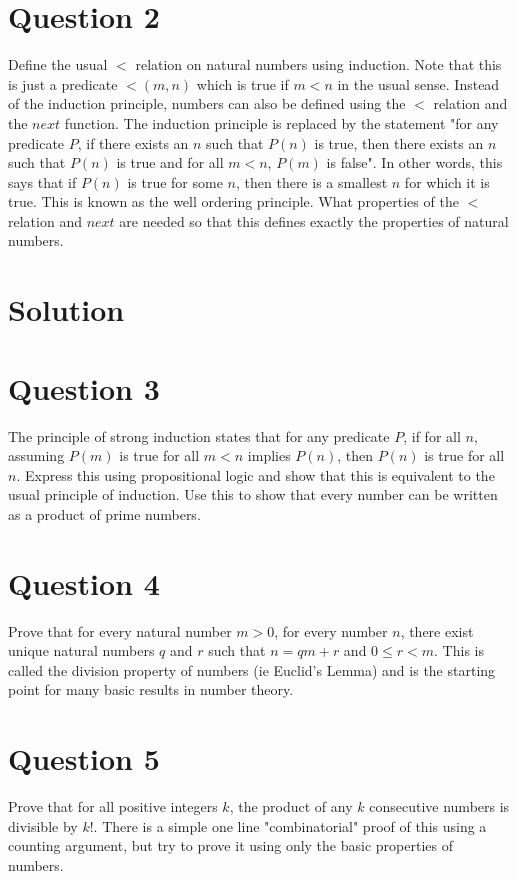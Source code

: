 \documentclass[12pt]{report}
\begin{document}
\section*{Question 2}
Define the usual $<$ relation on natural numbers using induction. Note that this is just a predicate $<(m, n)$ which is true if $m < n$ in the usual sense. Instead of the induction principle, numbers can also be defined using the $<$ relation and the $next$ function. The induction principle is replaced by the statement "for any predicate $P$, if there exists an $n$ such that $P(n)$ is true, then there exists an $n$ such that $P(n)$ is true and for all $m < n$, $P(m)$ is false". In other words, this says that if $P(n)$ is true for some $n$, then there is a smallest $n$ for which it is true. This is known as the well ordering principle. What properties of the $<$ relation and $next$ are needed so that this defines exactly the properties of natural numbers.
\section*{Solution}

\section*{Question 3}
The principle of strong induction states that for any predicate $P$, if for all $n$, assuming $P(m)$ is true for all $m < n$ implies $P(n)$, then $P(n)$ is true for all $n$. Express this using propositional logic and show that this is equivalent to the usual principle of induction. Use this to show that every number can be written as a product of prime numbers.

\section*{Question 4}
Prove that for every natural number $m > 0$, for every number $n$, there exist unique natural numbers $q$ and $r$ such that $n = qm + r$ and $0 \leq r < m$. This
is called the division property of numbers (ie Euclid's Lemma) and is the starting point for many basic results in number theory.
\section*{Question 5}
Prove that for all positive integers $k$, the product of any $k$ consecutive numbers is divisible by $k!$. There is a simple one line "combinatorial" proof of this using a counting argument, but try to prove it using only the basic properties of numbers.
\end{document}
